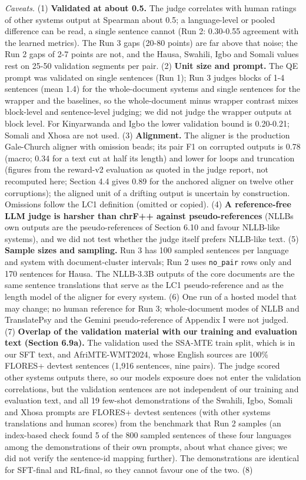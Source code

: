 \emph{Caveats.} (1) \textbf{Validated at about 0.5.} The judge correlates with human ratings of other systems\textquotesingle{} output at Spearman about 0.5; a language-level or pooled difference can be read, a single sentence cannot (Run 2: 0.30-0.55 agreement with the learned metrics). The Run 3 gaps (20-80 points) are far above that noise; the Run 2 gaps of 2-7 points are not, and the Hausa, Swahili, Igbo and Somali values rest on 25-50 validation segments per pair. (2) \textbf{Unit size and prompt.} The QE prompt was validated on single sentences (Run 1); Run 3 judges blocks of 1-4 sentences (mean 1.4) for the whole-document systems and single sentences for the wrapper and the baselines, so the whole-document minus wrapper contrast mixes block-level and sentence-level judging; we did not judge the wrapper outputs at block level. For Kinyarwanda and Igbo the lower validation bound is 0.20-0.21; Somali and Xhosa are not used. (3) \textbf{Alignment.} The aligner is the production Gale-Church aligner with omission beads; its pair F1 on corrupted outputs is 0.78 (macro; 0.34 for a text cut at half its length) and lower for loops and truncation (figures from the reward-v2 evaluation as quoted in the judge report, not recomputed here; Section 4.4 gives 0.89 for the anchored aligner on twelve other corruptions); the aligned unit of a drifting output is uncertain by construction. Omissions follow the LC1 definition (omitted or copied). (4) \textbf{A reference-free LLM judge is harsher than chrF++ against pseudo-references} (NLLB\textquotesingle s own outputs are the pseudo-references of Section 6.10 and favour NLLB-like systems), and we did not test whether the judge itself prefers NLLB-like text. (5) \textbf{Sample sizes and sampling.} Run 3 has 100 sampled sentences per language and system with document-cluster intervals; Run 2 uses \texttt{no\_pair} rows only and 170 sentences for Hausa. The NLLB-3.3B outputs of the core documents are the same sentence translations that serve as the LC1 pseudo-reference and as the length model of the aligner for every system. (6) One run of a hosted model that may change; no human reference for Run 3; whole-document modes of NLLB and TranslatePsy and the Gemini pseudo-reference of Appendix I were not judged. (7) \textbf{Overlap of the validation material with our training and evaluation text (Section 6.9a).} The validation used the SSA-MTE train split, which is in our SFT text, and AfriMTE-WMT2024, whose English sources are 100\% FLORES+ devtest sentences (1,916 sentences, nine pairs). The judge scored other systems\textquotesingle{} outputs there, so our models\textquotesingle{} exposure does not enter the validation correlations, but the validation sentences are not independent of our training and evaluation text, and all 19 few-shot demonstrations of the Swahili, Igbo, Somali and Xhosa prompts are FLORES+ devtest sentences (with other systems\textquotesingle{} translations and human scores) from the benchmark that Run 2 samples (an index-based check found 5 of the 800 sampled sentences of these four languages among the demonstrations of their own prompts, about what chance gives; we did not verify the sentence-id mapping further). The demonstrations are identical for SFT-final and RL-final, so they cannot favour one of the two. (8) 